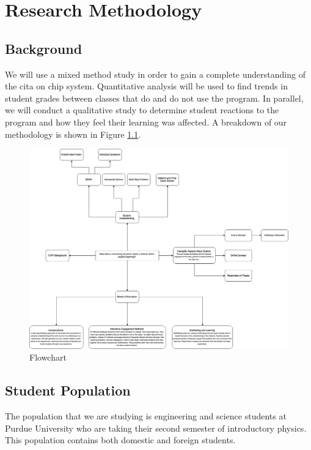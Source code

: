 \chapter[Chapter 3: Research Methodology]{Research Methodology}

\section{Background}

We will use a mixed method study in order to gain a complete understanding of the \gls{cita} on \gls{chip} system. Quantitative analysis will be used to find trends in student grades between classes that do and do not use the program. In parallel, we will conduct a qualitative study to determine student reactions to the program and how they feel their learning was affected. A breakdown of our methodology is shown in Figure \ref{fig:flowchart}.

\begin{figure}[!htb]
	\centering
	\includegraphics[width=6in]{img/chapter3/flowchart}
	\caption[Flowchart]{Flowchart}
  \label{fig:flowchart}
\end{figure}

\section{Student Population}

The population that we are studying is engineering and science students at Purdue University who are taking their second semester of introductory physics. This population contains both domestic and foreign students.

